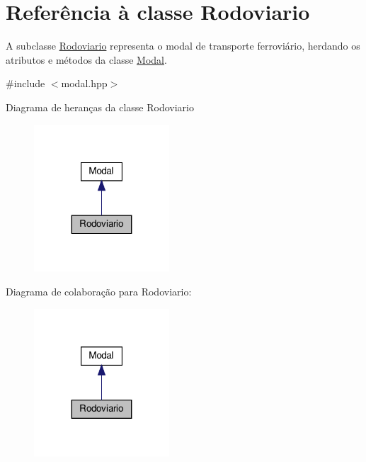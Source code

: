 \hypertarget{classRodoviario}{}\section{Referência à classe Rodoviario}
\label{classRodoviario}


A subclasse \hyperlink{classRodoviario}{Rodoviario} representa o modal de transporte ferroviário, herdando os atributos e métodos da classe \hyperlink{classModal}{Modal}.  




{\ttfamily \#include $<$modal.\+hpp$>$}



Diagrama de heranças da classe Rodoviario
\nopagebreak
\begin{figure}[H]
\begin{center}
\leavevmode
\includegraphics[width=143pt]{classRodoviario__inherit__graph}
\end{center}
\end{figure}


Diagrama de colaboração para Rodoviario\+:
\nopagebreak
\begin{figure}[H]
\begin{center}
\leavevmode
\includegraphics[width=143pt]{classRodoviario__coll__graph}
\end{center}
\end{figure}

